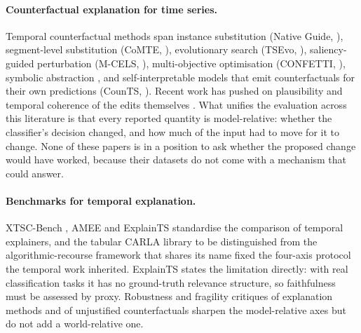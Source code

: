 \documentclass{article}
\begin{document}
\paragraph{Counterfactual explanation for time series.}
Temporal counterfactual methods span instance substitution (Native Guide, \citealp{delaney2021nativeguide}), segment-level substitution (CoMTE, \citealp{ates2021comte}), evolutionary search (TSEvo, \citealp{hollig2022tsevo}), saliency-guided perturbation (M-CELS, \citealp{li2024mcels}), multi-objective optimisation (CONFETTI, \citealp{paredescetina2025confetti}), symbolic abstraction \citep{pludowski2025mascots}, and self-interpretable models that emit counterfactuals for their own predictions (CounTS, \citealp{yan2023counts}). Recent work has pushed on plausibility and temporal coherence of the edits themselves \citep{kostrzewa2026plausibility,zuin2026navigating,voets2026contex}.
What unifies the evaluation across this literature is that every reported quantity is model-relative: whether the classifier's decision changed, and how much of the input had to move for it to change. None of these papers is in a position to ask whether the proposed change would have worked, because their datasets do not come with a mechanism that could answer.

\paragraph{Benchmarks for temporal explanation.}
XTSC-Bench \citep{hollig2023xtscbench}, AMEE \citep{nguyen2024amee} and ExplainTS \citep{mozolewski2026explaints} standardise the comparison of temporal explainers, and the tabular CARLA library \citep{pawelczyk2021carla} to be distinguished from the algorithmic-recourse framework that shares its name \citep{karimi2021recourse} fixed the four-axis protocol the temporal work inherited. ExplainTS states the limitation directly: with real classification tasks it has no ground-truth relevance structure, so faithfulness must be assessed by proxy. Robustness and fragility critiques of explanation methods \citep{ghorbani2019fragile,yeh2019infidelity,artelt2021robustness} and of unjustified counterfactuals \citep{laugel2019dangers,poyiadzi2020face} sharpen the model-relative axes but do not add a world-relative one.
\end{document}
